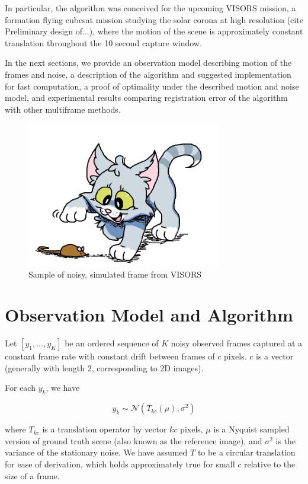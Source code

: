 \documentclass{article}
\begin{document}
In particular, the algorithm was conceived for the upcoming VISORS mission, a formation flying cubesat mission studying the solar corona at high resolution (cite Preliminary design of...), where the motion of the scene is approximately constant translation throughout the 10 second capture window.

In the next sections, we provide an observation model describing motion of the frames and noise, a description of the algorithm and suggested implementation for fast computation, a proof of optimality under the described motion and noise model, and experimental results comparing registration error of the algorithm with other multiframe methods.

\begin{figure}[htb]
  \begin{minipage}[b]{1\linewidth}
    \centering
    \centerline{\includegraphics[width=8.5cm]{images/cat.png}}
  \end{minipage}
  \caption{Sample of noisy, simulated frame from VISORS}
  \label{fig:scene}
\end{figure}


\section{Observation Model and Algorithm}
\label{sec:algorithm}

Let $[y_1, ..., y_K]$ be an ordered sequence of $K$ noisy observed frames captured at a constant frame rate with constant drift between frames of $c$ pixels. $c$ is a vector (generally with length 2, corresponding to 2D images).

For each $y_k$, we have

$$y_k \sim \mathcal{N}(T_{kc}(\mu), \sigma^2)$$

where $T_{kc}$ is a translation operator by vector $kc$ pixels, $\mu$ is a Nyquist sampled version of ground truth scene (also known as the reference image), and $\sigma^2$ is the variance of the stationary noise.  We have assumed $T$ to be a circular translation for ease of derivation, which holds approximately true for small $c$ relative to the size of a frame.
\end{document}
